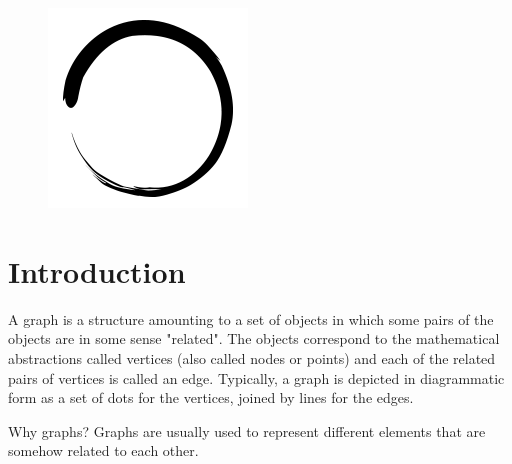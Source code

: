 \documentclass[12pt]{article}
\title{\vspace{-2em}\mytitle\vspace{-0.3em}}
\author{\textbf{Editor}\\Kayacan Vesek\\ \ \\ \textbf{Reviewer} \\Yasin Kaya}
\date{}
\begin{document}
\begin{figure}
  \centering
  \includegraphics[width=\linewidth/4]{inzva-logo.png}
  \label{fig:inzva}
\end{figure}
\maketitle

\cleardoublepage
\tableofcontents
{}
\cleardoublepage
\newcommand{\sectionbreak}{\clearpage}

\section{Introduction}

A graph is a structure amounting to a set of objects in which some pairs of the objects are in some sense "related". The objects correspond to the mathematical abstractions called vertices (also called nodes or points) and each of the related pairs of vertices is called an edge. Typically, a graph is depicted in diagrammatic form as a set of dots for the vertices, joined by lines for the edges. \cite{1}

Why graphs? Graphs are usually used to represent different elements that are somehow related to each other.
\end{document}

